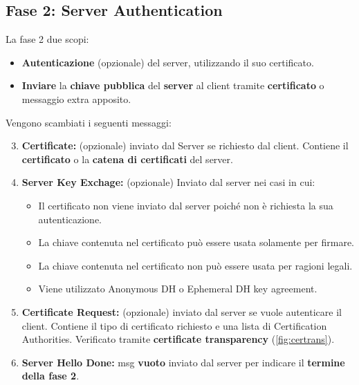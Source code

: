 \subsection{Fase 2: Server Authentication}
La fase 2 due scopi:
\begin{proposition}[Phase 2]\label{prop:phase2}
\begin{itemize}
    \item \textbf{Autenticazione} (opzionale) del server, utilizzando il suo certificato.
    \item \textbf{Inviare} la \textbf{chiave pubblica} del \textbf{server} al client tramite \textbf{certificato} o messaggio extra apposito.
\end{itemize}
\end{proposition}
Vengono scambiati i seguenti messaggi:\pagebreak
\begin{definition}\label{def:hand2}
\begin{enumerate}  \setcounter{enumi}{2}
    \item \textbf{Certificate:} (opzionale) inviato dal Server se richiesto dal client. Contiene il \textbf{certificato} o la \textbf{catena di certificati} del server.
    \item \textbf{Server Key Exchage:} (opzionale) Inviato dal server nei casi in cui:
    \begin{itemize}
        \item Il certificato non viene inviato dal server poiché non è richiesta la sua autenticazione. 
        \item  La chiave contenuta nel certificato può essere usata solamente per firmare.    
        \item La chiave contenuta nel certificato non può essere usata per ragioni legali.
        \item Viene utilizzato Anonymous DH o Ephemeral DH key agreement.
    \end{itemize}
    \item\textbf{ Certificate Request:} (opzionale) inviato dal server se vuole autenticare il client. Contiene il tipo di certificato richiesto e una lista di Certification Authorities. Verificato tramite \textbf{certificate transparency} (\cref{fig:certrans}).
    \item \textbf{Server Hello Done:} msg \textbf{vuoto} inviato dal server per indicare il \textbf{termine della fase 2}.
\end{enumerate}
\end{definition}
